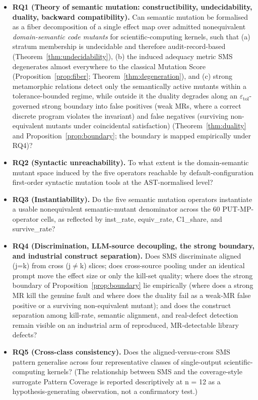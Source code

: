 \documentclass[manuscript,screen,review]{acmart}
\begin{document}
\begin{itemize}

\item
  \textbf{RQ1 (Theory of semantic mutation: constructibility,
  undecidability, duality, backward compatibility).} Can semantic
  mutation be formalised as a fiber decomposition of a single effect map
  over admitted nonequivalent \emph{domain-semantic code mutants} for
  scientific-computing kernels, such that (a) stratum membership is
  undecidable and therefore audit-record-based (Theorem~\ref{thm:undecidability}), (b) the
  induced adequacy metric SMS degenerates almost everywhere to the
  classical Mutation Score (Proposition~\ref{prop:fiber}; Theorem~\ref{thm:degeneration}), and (c)
  strong metamorphic relations detect only the semantically active
  mutants within a tolerance-bounded regime, while outside it the duality
  degrades along an $\varepsilon_{\mathrm{tol}}$-governed strong boundary
  into false positives (weak MRs, where a correct discrete program
  violates the invariant) and false negatives (surviving non-equivalent
  mutants under coincidental satisfaction) (Theorem~\ref{thm:duality} and Proposition~\ref{prop:boundary};
  the boundary is mapped empirically under RQ4)?
\item
  \textbf{RQ2 (Syntactic unreachability).} To what extent is the
  domain-semantic mutant space induced by the five operators reachable
  by default-configuration first-order syntactic mutation tools at the
  AST-normalised level?
\item
  \textbf{RQ3 (Instantiability).} Do the five semantic mutation
  operators instantiate a usable nonequivalent semantic-mutant
  denominator across the 60 PUT-MP-operator cells, as reflected by
  inst\_rate, equiv\_rate, C1\_share, and survive\_rate?
\item
  \textbf{RQ4 (Discrimination, LLM-source decoupling, the strong boundary, and
  industrial construct separation).} Does SMS discriminate aligned (j=k) from
  cross (j$\neq$k) slices; does cross-source pooling under an identical prompt
  move the effect size or only the kill-set quality; where does the strong
  boundary of Proposition~\ref{prop:boundary} lie empirically (where does a
  strong MR kill the genuine fault and where does the duality fail as a weak-MR
  false positive or a surviving non-equivalent mutant); and does the construct
  separation among kill-rate, semantic alignment, and real-defect detection
  remain visible on an industrial arm of reproduced, MR-detectable library
  defects?
\item
  \textbf{RQ5 (Cross-class consistency).} Does the aligned-versus-cross
  SMS pattern generalise across four representative classes of
  single-output scientific-computing kernels? (The relationship between
  SMS and the coverage-style surrogate Pattern Coverage is reported
  descriptively at n = 12 as a hypothesis-generating observation, not a
  confirmatory test.)
\end{itemize}
\end{document}
